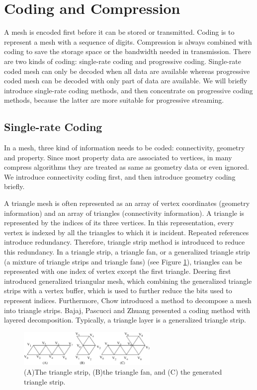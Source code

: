 \documentclass[11pt, a4paper]{report}
\begin{document}
    \section{Coding and Compression}
    A mesh is encoded first before it can be stored or
    transmitted. Coding is to represent a mesh with a sequence of
    digits. Compression is always combined with coding to save the storage space
    or the bandwidth needed in transmission. 
    There are two kinds of coding:
    single-rate coding and progressive coding. 
    Single-rate coded mesh can only be decoded when all data are available 
    whereas progressive coded mesh can be decoded with only part of data are available. 
    We will briefly introduce single-rate coding methods, and then concentrate on
    progressive coding methods, because the latter are more suitable for progressive streaming.
    
    \subsection{Single-rate Coding} \label{single_rate}
    In a mesh, three kind of information needs to be coded:
    connectivity, geometry and property. 
    Since most property data are associated to vertices, 
    in many compress algorithms they are treated as same as geometry data or even
    ignored. We introduce connectivity coding first, and then introduce geometry coding briefly.
    
    A triangle mesh is often represented as an array of vertex coordinates
    (geometry information) and an array of triangles (connectivity information). 
    A triangle is represented by the indices of its three vertices.
    In this representation, every vertex is indexed by all the
    triangles to which it is incident. Repeated references introduce
    redundancy. Therefore, triangle strip method is introduced to
    reduce this redundancy. In a triangle strip, a triangle fan, or a
    generalized triangle strip (a mixture of triangle strips and
    triangle fans) (see Figure \ref{strip}), 
    triangles can be represented with one index of vertex
    except the first triangle. 
    Deering \cite{218391} first introduced generalized triangular mesh, 
    which combining the generalized triangle strips with a vertex buffer,
    which is used to further reduce the bits used to represent indices. 
    Furthermore, Chow \cite{267103} introduced a method to
    decompose a mesh into triangle strips. 
    Bajaj, Pascucci and Zhuang \cite{789628} presented a coding method with layered
    decomposition. 
    Typically, a triangle layer is a generalized triangle strip. 
    \begin{figure}[ht]
    \centering
    \includegraphics[width=0.6\textwidth]{strip.eps}
    \caption{(A)The triangle strip, (B)the triangle fan, and (C) the generated triangle strip.}\label{strip}
    \end{figure}
\end{document}
